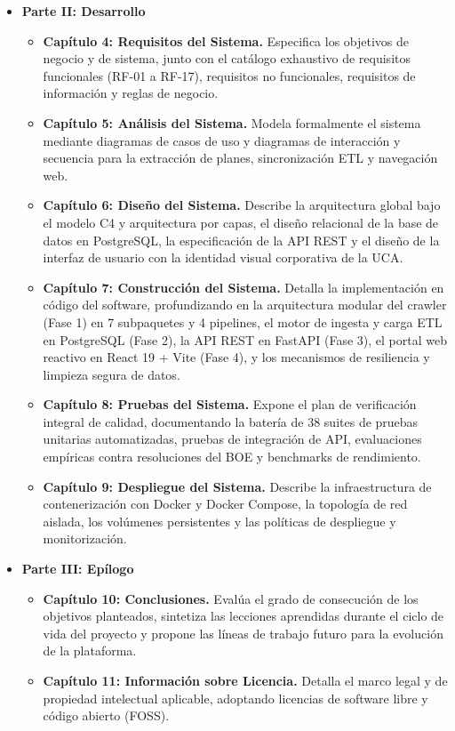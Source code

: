\begin{itemize}
    \item \textbf{Parte II: Desarrollo}
    \begin{itemize}
        \item \textbf{Capítulo 4: Requisitos del Sistema.} Especifica los objetivos de negocio y de sistema, junto con el catálogo exhaustivo de requisitos funcionales (RF-01 a RF-17), requisitos no funcionales, requisitos de información y reglas de negocio.
        \item \textbf{Capítulo 5: Análisis del Sistema.} Modela formalmente el sistema mediante diagramas de casos de uso y diagramas de interacción y secuencia para la extracción de planes, sincronización ETL y navegación web.
        \item \textbf{Capítulo 6: Diseño del Sistema.} Describe la arquitectura global bajo el modelo C4 y arquitectura por capas, el diseño relacional de la base de datos en PostgreSQL, la especificación de la API REST y el diseño de la interfaz de usuario con la identidad visual corporativa de la UCA.
        \item \textbf{Capítulo 7: Construcción del Sistema.} Detalla la implementación en código del software, profundizando en la arquitectura modular del crawler (Fase 1) en 7 subpaquetes y 4 pipelines, el motor de ingesta y carga ETL en PostgreSQL (Fase 2), la API REST en FastAPI (Fase 3), el portal web reactivo en React 19 + Vite (Fase 4), y los mecanismos de resiliencia y limpieza segura de datos.
        \item \textbf{Capítulo 8: Pruebas del Sistema.} Expone el plan de verificación integral de calidad, documentando la batería de 38 suites de pruebas unitarias automatizadas, pruebas de integración de API, evaluaciones empíricas contra resoluciones del BOE y benchmarks de rendimiento.
        \item \textbf{Capítulo 9: Despliegue del Sistema.} Describe la infraestructura de contenerización con Docker y Docker Compose, la topología de red aislada, los volúmenes persistentes y las políticas de despliegue y monitorización.
    \end{itemize}

    \item \textbf{Parte III: Epílogo}
    \begin{itemize}
        \item \textbf{Capítulo 10: Conclusiones.} Evalúa el grado de consecución de los objetivos planteados, sintetiza las lecciones aprendidas durante el ciclo de vida del proyecto y propone las líneas de trabajo futuro para la evolución de la plataforma.
        \item \textbf{Capítulo 11: Información sobre Licencia.} Detalla el marco legal y de propiedad intelectual aplicable, adoptando licencias de software libre y código abierto (FOSS).
    \end{itemize}


\end{itemize}
